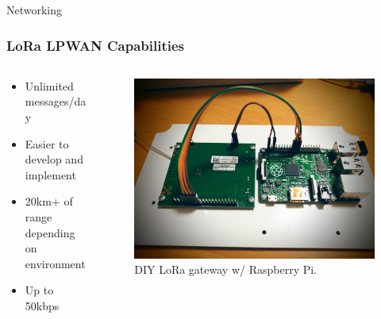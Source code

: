 \documentclass{beamer}
\begin{document}
  \begin{frame}{Networking}
    \frametitle{LoRa LPWAN Capabilities}
    \begin{columns}
      \begin{column}{0.5\textwidth}
        \begin{itemize}
          \item Unlimited messages/day
          \item Easier to develop and implement
          \item 20km+ of range depending on environment
          \item Up to 50kbps
        \end{itemize}
      \end{column}
      \begin{column}{0.5\textwidth}
        \begin{figure}[htbp]
          \centering
          \includegraphics[width=\textwidth]{DIYloraGateway.jpg}
          \caption{DIY LoRa gateway w/ Raspberry Pi.\cite{DIYLoRa}}
          \label{fig:DIY_LoRa_Gateway}
        \end{figure}
      \end{column}
    \end{columns}
  \end{frame}
\end{document}
